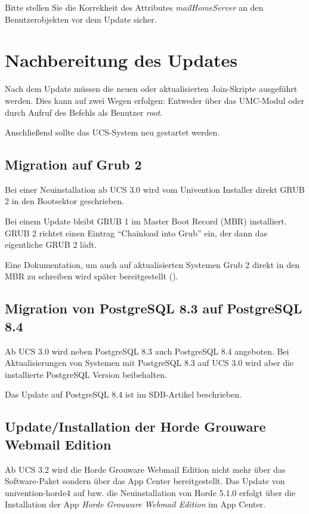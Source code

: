 Bitte stellen Sie die Korrekheit des Attributes \emph{mailHomeServer} an den
Benutzerobjekten vor dem Update sicher.

\chapter{Nachbereitung des Updates}

Nach dem Update müssen die neuen oder aktualisierten Join-Skripte
ausgeführt werden. Dies kann auf zwei Wegen erfolgen: Entweder über
das UMC-Modul  oder durch Aufruf des
Befehls  als
Benutzer \emph{root}.

Anschließend sollte das UCS-System neu gestartet werden.

\section{Migration auf Grub 2}

Bei einer Neuinstallation ab UCS 3.0 wird vom Univention Installer direkt GRUB 2 in den
Bootsektor geschrieben.

Bei einem Update bleibt GRUB 1 im Master Boot Record (MBR) installiert. GRUB 2
richtet einen Eintrag ``Chainload into Grub'' ein, der dann das eigentliche
GRUB 2 lädt.

Eine Dokumentation, um auch auf aktualisierten Systemen Grub 2 direkt
in den MBR zu schreiben wird später bereitgestellt ().

\section{Migration von PostgreSQL 8.3 auf PostgreSQL 8.4}
Ab UCS 3.0 wird neben PostgreSQL 8.3 auch PostgreSQL 8.4
angeboten. Bei Aktualisierungen von Systemen mit PostgreSQL 8.3 auf
UCS 3.0 wird aber die installierte PostgreSQL Version beibehalten.

Das Update auf PostgreSQL 8.4 ist im
SDB-Artikel  beschrieben.

\section{Update/Installation der Horde Grouware Webmail Edition}

Ab UCS 3.2 wird die Horde Grouware Webmail Edition nicht mehr über das
Software-Paket  sondern über das App Center
bereitgestellt. Das Update von univention-horde4 auf bzw. die Neuinstallation
von Horde 5.1.0 erfolgt über die Installation der App \emph{Horde Grouware Webmail
Edition} im App Center.

